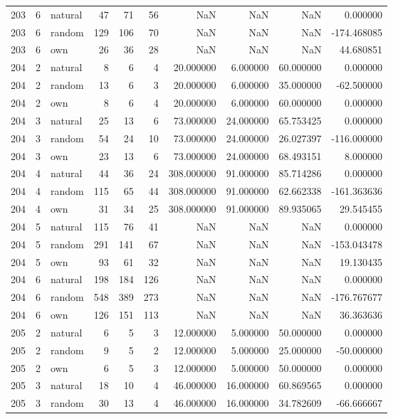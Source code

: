 \begin{table}[htbp]
\begin{tabular}{rrlrrrrrrr}
203 & 6 & natural & 47 & 71 & 56 & NaN & NaN & NaN & 0.000000 \\
203 & 6 & random & 129 & 106 & 70 & NaN & NaN & NaN & -174.468085 \\
203 & 6 & own & 26 & 36 & 28 & NaN & NaN & NaN & 44.680851 \\
204 & 2 & natural & 8 & 6 & 4 & 20.000000 & 6.000000 & 60.000000 & 0.000000 \\
204 & 2 & random & 13 & 6 & 3 & 20.000000 & 6.000000 & 35.000000 & -62.500000 \\
204 & 2 & own & 8 & 6 & 4 & 20.000000 & 6.000000 & 60.000000 & 0.000000 \\
204 & 3 & natural & 25 & 13 & 6 & 73.000000 & 24.000000 & 65.753425 & 0.000000 \\
204 & 3 & random & 54 & 24 & 10 & 73.000000 & 24.000000 & 26.027397 & -116.000000 \\
204 & 3 & own & 23 & 13 & 6 & 73.000000 & 24.000000 & 68.493151 & 8.000000 \\
204 & 4 & natural & 44 & 36 & 24 & 308.000000 & 91.000000 & 85.714286 & 0.000000 \\
204 & 4 & random & 115 & 65 & 44 & 308.000000 & 91.000000 & 62.662338 & -161.363636 \\
204 & 4 & own & 31 & 34 & 25 & 308.000000 & 91.000000 & 89.935065 & 29.545455 \\
204 & 5 & natural & 115 & 76 & 41 & NaN & NaN & NaN & 0.000000 \\
204 & 5 & random & 291 & 141 & 67 & NaN & NaN & NaN & -153.043478 \\
204 & 5 & own & 93 & 61 & 32 & NaN & NaN & NaN & 19.130435 \\
204 & 6 & natural & 198 & 184 & 126 & NaN & NaN & NaN & 0.000000 \\
204 & 6 & random & 548 & 389 & 273 & NaN & NaN & NaN & -176.767677 \\
204 & 6 & own & 126 & 151 & 113 & NaN & NaN & NaN & 36.363636 \\
205 & 2 & natural & 6 & 5 & 3 & 12.000000 & 5.000000 & 50.000000 & 0.000000 \\
205 & 2 & random & 9 & 5 & 2 & 12.000000 & 5.000000 & 25.000000 & -50.000000 \\
205 & 2 & own & 6 & 5 & 3 & 12.000000 & 5.000000 & 50.000000 & 0.000000 \\
205 & 3 & natural & 18 & 10 & 4 & 46.000000 & 16.000000 & 60.869565 & 0.000000 \\
205 & 3 & random & 30 & 13 & 4 & 46.000000 & 16.000000 & 34.782609 & -66.666667 \\

\end{tabular}
\end{table}
